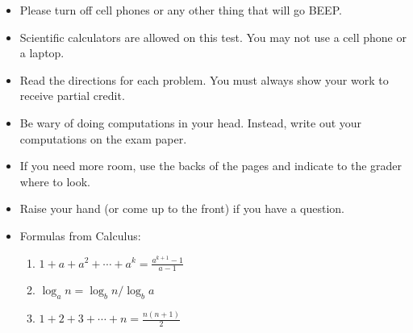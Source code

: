 \documentclass[12pt]{article}
\newcommand{\be}{\begin{enumerate}}
\newcommand{\ee}{\end{enumerate}}
\begin{document}
\begin{itemize}
\item Please turn off cell phones or any other thing that will go BEEP.

\item
Scientific calculators are allowed on this test. You may not use a cell phone or a laptop.
\item
Read the directions for each problem. You must always show your work to receive partial credit.  

\item Be wary of doing computations in your head. Instead, write out your
computations on the exam paper.

\item
If you need more room, use the backs of the pages and indicate to the
grader where to look.

\item
Raise your hand (or come up to the front) if you have a question.
\item Formulas from Calculus:\\
\be 
\item $1+a+a^2+\cdots+ a^{k}=\frac{a^{k+1}-1}{a-1}$\\
\item $\log_a n = \log_b n / \log_b a$\\
\item $1+2+3+\cdots+n=\frac{n(n+1)}{2}$
\ee

\end{itemize}
\end{document}
